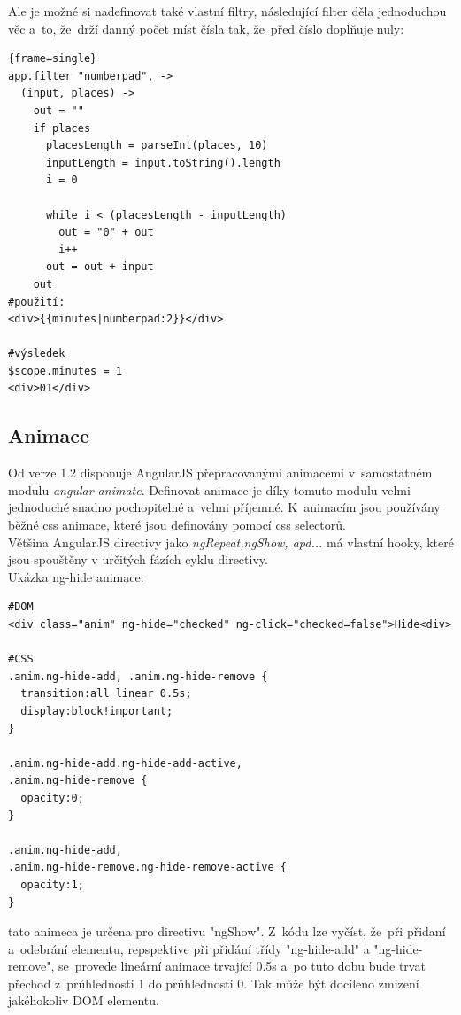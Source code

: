 \documentclass[a4paper,12pt,twoside,BCOR=10mm]{article}
\renewcommand{\it}[1]{\textit{#1}}    %
\newenvironment{codeframe}{%
  \begin{Sbox} 
    \begin{minipage} 
      {\columnwidth-\leftmargin-\rightmargin-2\fboxsep-2\fboxrule-4pt} 
}{%

  \end{minipage} 
  \end{Sbox} 
  \begin{center} 
    \fcolorbox{black}{codeback}{\TheSbox} 
  \end{center} 
}
\begin{document}
Ale je možné si nadefinovat také vlastní filtry, následující filter děla jednoduchou věc a~to, že~drží danný počet míst čísla tak, že~před číslo doplňuje nuly:
     \begin{codeframe} 
      \begin{Verbatim}{frame=single}
app.filter "numberpad", ->
  (input, places) ->
    out = ""
    if places
      placesLength = parseInt(places, 10)
      inputLength = input.toString().length
      i = 0

      while i < (placesLength - inputLength)
        out = "0" + out
        i++
      out = out + input
    out
#použití:
<div>{{minutes|numberpad:2}}</div>

#výsledek
$scope.minutes = 1
<div>01</div>
\end{Verbatim} 
    \end{codeframe}

\subsection{Animace}
Od verze 1.2 disponuje AngularJS přepracovanými animacemi v~samostatném modulu \it{angular-animate}. Definovat animace je díky tomuto modulu velmi jednoduché snadno pochopitelné a~velmi příjemné. K~animacím jsou používány běžné css animace, které jsou definovány pomocí css selectorů. \cite{angularAnimation}\\

Většina AngularJS directivy jako \it{ngRepeat,ngShow, apd...} má vlastní hooky, které jsou spouštěny v určitých fázích cyklu directivy.\cite{ngBOOK}\\

Ukázka ng-hide animace:
\begin{codeframe}
  \begin{verbatim}
#DOM
<div class="anim" ng-hide="checked" ng-click="checked=false">Hide<div>

#CSS
.anim.ng-hide-add, .anim.ng-hide-remove {
  transition:all linear 0.5s;
  display:block!important;
}

.anim.ng-hide-add.ng-hide-add-active,
.anim.ng-hide-remove {
  opacity:0;
}

.anim.ng-hide-add,
.anim.ng-hide-remove.ng-hide-remove-active {
  opacity:1;
}
  \end{verbatim}
\end{codeframe}
tato animeca je určena pro directivu "ngShow". Z~kódu lze vyčíst, že~při přidaní a~odebrání elementu, repspektive při přidání třídy "ng-hide-add" a "ng-hide-remove", se~provede lineární animace trvající 0.5s a~po tuto dobu bude trvat přechod z~průhlednosti 1 do průhlednosti 0. Tak může být docíleno zmizení jakéhokoliv DOM elementu.\cite{ngBOOK}
\end{document}
